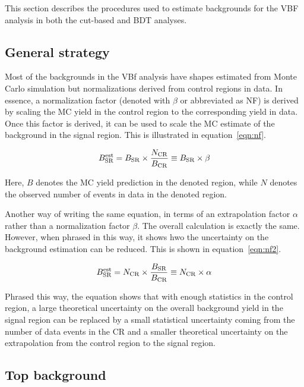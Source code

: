 This section describes the procedures used to estimate backgrounds for the VBF analysis in both the cut-based and BDT analyses. 

\subsection{General strategy}

Most of the backgrounds in the VBf analysis have shapes estimated from Monte Carlo simulation but normalizations derived from control regions in data. In essence, a normalization factor (denoted with $\beta$ or abbreviated as NF) is derived by scaling the MC yield in the control region to the corresponding yield in data. Once this factor is derived, it can be used to scale the MC estimate of the background in the signal region. This is illustrated in equation~\ref{eqn:nf}.

\begin{equation}
B_{\rm SR}^{\rm est} = B_{\rm SR} \times \frac{N_{\rm CR}}{B_{\rm CR}} \equiv B_{\rm SR} \times \beta
\label{eqn:nf}
\end{equation}

Here, $B$ denotes the MC yield prediction in the denoted region, while $N$ denotes the observed number of events in data in the denoted region. 

Another way of writing the same equation, in terms of an extrapolation factor $\alpha$ rather than a normalization factor $\beta$. The overall calculation is exactly the same. However, when phrased in this way, it shows hwo the uncertainty on the background estimation can be reduced. This is shown in equation~\ref{eqn:nf2}.

\begin{equation}
B_{\rm SR}^{\rm est} = N_{\rm CR} \times \frac{B_{\rm SR}}{B_{\rm CR}} \equiv N_{\rm CR} \times \alpha
\label{eqn:nf2}
\end{equation}

Phrased this way, the equation shows that with enough statistics in the control region, a large theoretical uncertainty on the overall background yield in the signal region can be replaced by a small statistical uncertainty coming from the number of data events in the CR and a smaller theoretical uncertainty on the extrapolation from the control region to the signal region. 

\subsection{Top background}

